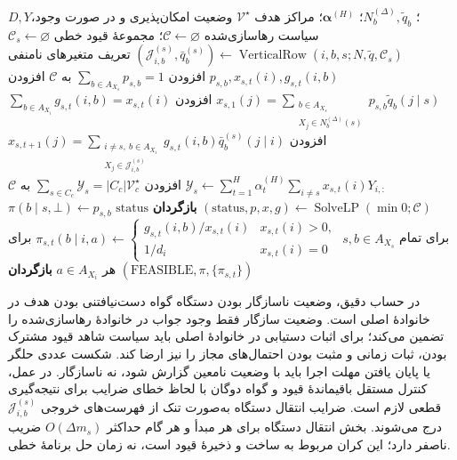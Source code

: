 \begin{algorithm}[!htbp]
\caption{روند $\operatorname{FlowAttainability}$: آزمون خطی دست‌یابی و بازسازی سیاست رهاسازی‌شده}
\label{cmp:alg:ch3-geometry-flow-attainability}
\begin{algorithmic}[1]
\REQUIRE $D,Y$؛ $N_b^{(\Delta)},\widetilde q_b$؛ $\boldsymbol\alpha^{(H)}$؛ مراکز هدف $\mathcal V^\star$
\ENSURE وضعیت امکان‌پذیری و در صورت وجود، سیاست رهاسازی‌شده
\STATE $\mathcal C\gets\varnothing$؛ مجموعهٔ قیود خطی
    \STATE $\mathcal C_s\gets\varnothing$
        \STATE $(\mathcal J_{i,b}^{(s)},\bar q_b^{(s)})\gets\operatorname{VerticalRow}(i,b,s;N,\widetilde q,\mathcal C_s)$
    \ENDFOR
    \STATE تعریف متغیرهای نامنفی $p_{s,b},x_{s,t}(i),g_{s,t}(i,b)$
    \STATE افزودن $\sum_{b\in A_{X_s}}p_{s,b}=1$ به $\mathcal C$
        \STATE افزودن $x_{s,1}(j)=\sum_{\substack{b\in A_{X_s}\\X_j\in N_b^{(\Delta)}(s)}}p_{s,b}\widetilde q_b(j\mid s)$
    \ENDFOR
            \STATE افزودن $\sum_{b\in A_{X_i}}g_{s,t}(i,b)=x_{s,t}(i)$
        \ENDFOR
            \STATE افزودن $x_{s,t+1}(j)=\sum_{\substack{i\ne s,\ b\in A_{X_i}\\X_j\in\mathcal J_{i,b}^{(s)}}}g_{s,t}(i,b)\bar q_b^{(s)}(j\mid i)$
        \ENDFOR
    \ENDFOR
    \STATE $\mathscr Y_s\gets\sum_{t=1}^H\alpha_t^{(H)}\sum_{i\ne s}x_{s,t}(i)Y_{i,:}$ 
\ENDFOR
{}
    \STATE افزودن $\sum_{s\in C_c}\mathscr Y_s=|C_c|\mathcal V_c^\star$ به $\mathcal C$
\ENDFOR
\STATE $(\mathrm{status},p,x,g)\gets\operatorname{SolveLP}(\min 0;\mathcal C)$
    \STATE \textbf{بازگردان} $\mathrm{status}$ 
\ENDIF
\STATE $\pi(b\mid s,\bot)\gets p_{s,b}$ برای تمام $s,b\in A_{X_s}$
    \STATE $\pi_{s,t}(b\mid i,a)\gets\begin{cases}g_{s,t}(i,b)/x_{s,t}(i)&x_{s,t}(i)>0,\\1/d_i&x_{s,t}(i)=0\end{cases}$ برای هر $a\in A_{X_i}$
\ENDFOR
\STATE \textbf{بازگردان} $(\mathrm{FEASIBLE},\pi,\{\pi_{s,t}\})$
\end{algorithmic}
\end{algorithm}

در حساب دقیق، وضعیت ناسازگار بودن دستگاه گواه دست‌نیافتنی بودن هدف در خانوادهٔ اصلی است. وضعیت سازگار فقط وجود جواب در خانوادهٔ رهاسازی‌شده را تضمین می‌کند؛ برای اثبات دستیابی در خانوادهٔ اصلی باید سیاست شاهد قیود مشترک بودن، ثبات زمانی و مثبت بودن احتمال‌های مجاز را نیز ارضا کند. شکست عددی حلگر یا پایان یافتن مهلت اجرا باید با وضعیت نامعین گزارش شود، نه ناسازگار. در عمل، کنترل مستقل باقیماندهٔ قیود و گواه دوگان با لحاظ خطای ضرایب برای نتیجه‌گیری قطعی لازم است. ضرایب انتقال دستگاه به‌صورت تنک از فهرست‌های خروجی $\mathcal J_{i,b}^{(s)}$ درج می‌شوند. بخش انتقال دستگاه برای هر مبدأ و هر گام حداکثر $O(\Delta m_s)$ ضریب ناصفر دارد؛ این کران مربوط به ساخت و ذخیرهٔ قیود است، نه زمان حل برنامهٔ خطی.

